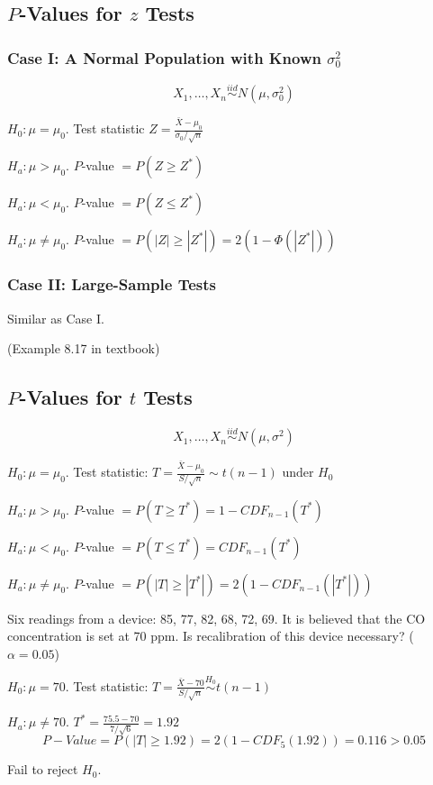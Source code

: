 \subsection{$P$-Values for $z$ Tests}
\subsubsection{Case I: A Normal Population with Known $\sigma_0^2$}
\[X_1,\dots,X_n \overset{iid}{\sim} N(\mu,\sigma_0^2)\]

$H_0:\mu=\mu_0$. Test statistic $Z=\frac{\bar{X}-\mu_0}{\sigma_0/\sqrt{n}}$

$H_a:\mu>\mu_0$. $P$-value $= P(Z \geq Z^*)$

$H_a:\mu<\mu_0$. $P$-value $= P(Z \leq Z^*)$

$H_a:\mu\neq\mu_0$. $P$-value $= P(|Z| \geq |Z^*|)=2(1-\Phi(|Z^*|))$

\subsubsection{Case II: Large-Sample Tests}
Similar as Case I.

\begin{exmp}
(Example 8.17 in textbook)
\end{exmp}

\subsection{$P$-Values for $t$ Tests}
\[X_1,\dots,X_n \overset{iid}{\sim} N(\mu,\sigma^2)\]

$H_0:\mu=\mu_0$. Test statistic: $T=\frac{\bar{X}-\mu_0}{S/\sqrt{n}} \sim t(n-1) \text{ under } H_0$

$H_a:\mu>\mu_0$. $P$-value $= P(T \geq T^*)=1-CDF_{n-1}(T^*)$

$H_a:\mu<\mu_0$. $P$-value $= P(T \leq T^*)=CDF_{n-1}(T^*)$

$H_a:\mu\neq\mu_0$. $P$-value $= P(|T| \geq |T^*|)=2(1-CDF_{n-1}(|T^*|))$

\begin{exmp}
Six readings from a device: 85, 77, 82, 68, 72, 69. It is believed that the CO concentration is set at 70 ppm. Is recalibration of this device necessary? ($\alpha=0.05$)

$H_0:\mu=70$. Test statistic: $T=\frac{\bar{X}-70}{S/\sqrt{n}} \overset{H_0}{\sim} t(n-1) $

$H_a:\mu\neq 70$. $T^*=\frac{75.5-70}{7/\sqrt{6}}=1.92 $
\[P-Value=P(|T|\geq 1.92)=2(1-CDF_5(1.92))=0.116>0.05\]

Fail to reject $H_0$.
\end{exmp}


